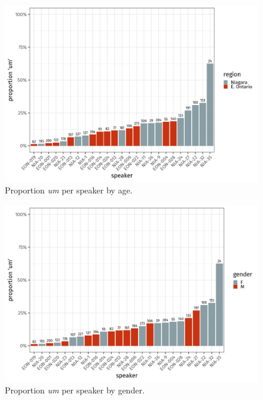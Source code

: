 \documentclass[11pt]{article}
\begin{document}
\begin{figure}[htpb]
    \centering
    \includegraphics[width=0.8\linewidth]{figures/indivage.png}
    \caption{Proportion \emph{um} per speaker by age.}
    \label{fig:indivage}
\end{figure}

\begin{figure}[htpb]
    \centering
    \includegraphics[width=0.8\linewidth]{figures/indivgender.png}
    \caption{Proportion \emph{um} per speaker by gender.}
    \label{fig:indivgender}
\end{figure}
\end{document}
